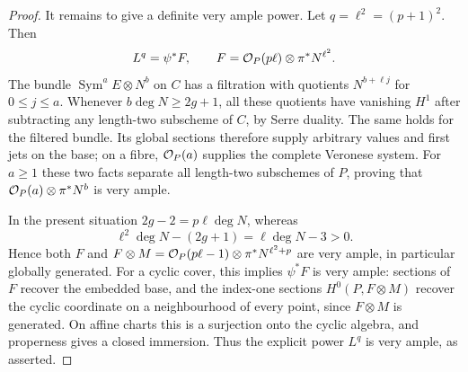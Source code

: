 \begin{proof}
It remains to give a definite very ample power.  Let $q=\ell^2=(p+1)^2$.  Then
\[
 L^q=\psi^*F,\qquad
 F=\mathcal O_P(p\ell)\otimes\pi^*N^{\ell^2}.
\]
The bundle $\operatorname{Sym}^aE\otimes N^b$ on $C$ has a filtration with quotients $N^{b+\ell j}$ for $0\leq j\leq a$.  Whenever $b\deg N\geq2g+1$, all these quotients have vanishing $H^1$ after subtracting any length-two subscheme of $C$, by Serre duality.  The same holds for the filtered bundle.  Its global sections therefore supply arbitrary values and first jets on the base; on a fibre, $\mathcal O_P(a)$ supplies the complete Veronese system.  For $a\geq1$ these two facts separate all length-two subschemes of $P$, proving that $\mathcal O_P(a)\otimes\pi^*N^b$ is very ample.

In the present situation $2g-2=p\ell\deg N$, whereas
\[
 \ell^2\deg N-(2g+1)=\ell\deg N-3>0.
\]
Hence both $F$ and $F\otimes M=\mathcal O_P(p\ell-1)\otimes\pi^*N^{\ell^2+p}$ are very ample, in particular globally generated.  For a cyclic cover, this implies $\psi^*F$ is very ample: sections of $F$ recover the embedded base, and the index-one sections $H^0(P,F\otimes M)$ recover the cyclic coordinate on a neighbourhood of every point, since $F\otimes M$ is generated.  On affine charts this is a surjection onto the cyclic algebra, and properness gives a closed immersion.  Thus the explicit power $L^q$ is very ample, as asserted.
\end{proof}


